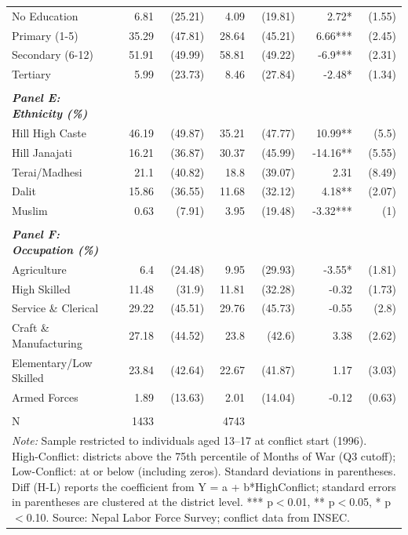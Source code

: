 \begin{landscape}
\begin{table}[!h]
{\begin{tabular}[t]{lrrrrrr}
No Education & 6.81 & (25.21) & 4.09 & (19.81) & 2.72* & (1.55)\\
Primary (1-5) & 35.29 & (47.81) & 28.64 & (45.21) & 6.66*** & (2.45)\\
\addlinespace
Secondary (6-12) & 51.91 & (49.99) & 58.81 & (49.22) & -6.9*** & (2.31)\\
Tertiary & 5.99 & (23.73) & 8.46 & (27.84) & -2.48* & (1.34)\\
 &  &  &  &  &  & \\
\em{\textbf{Panel E: Ethnicity (\%)}} & \em{\textbf{}} & \em{\textbf{}} & \em{\textbf{}} & \em{\textbf{}} & \em{\textbf{}} & \em{\textbf{}}\\
Hill High Caste & 46.19 & (49.87) & 35.21 & (47.77) & 10.99** & (5.5)\\
\addlinespace
Hill Janajati & 16.21 & (36.87) & 30.37 & (45.99) & -14.16** & (5.55)\\
Terai/Madhesi & 21.1 & (40.82) & 18.8 & (39.07) & 2.31 & (8.49)\\
Dalit & 15.86 & (36.55) & 11.68 & (32.12) & 4.18** & (2.07)\\
Muslim & 0.63 & (7.91) & 3.95 & (19.48) & -3.32*** & (1)\\
 &  &  &  &  &  & \\
\addlinespace
\em{\textbf{Panel F: Occupation (\%)}} & \em{\textbf{}} & \em{\textbf{}} & \em{\textbf{}} & \em{\textbf{}} & \em{\textbf{}} & \em{\textbf{}}\\
Agriculture & 6.4 & (24.48) & 9.95 & (29.93) & -3.55* & (1.81)\\
High Skilled & 11.48 & (31.9) & 11.81 & (32.28) & -0.32 & (1.73)\\
Service \& Clerical & 29.22 & (45.51) & 29.76 & (45.73) & -0.55 & (2.8)\\
Craft \& Manufacturing & 27.18 & (44.52) & 23.8 & (42.6) & 3.38 & (2.62)\\
\addlinespace
Elementary/Low Skilled & 23.84 & (42.64) & 22.67 & (41.87) & 1.17 & (3.03)\\
Armed Forces & 1.89 & (13.63) & 2.01 & (14.04) & -0.12 & (0.63)\\
 &  &  &  &  &  & \\
N & 1433 &  & 4743 &  &  & \\
\bottomrule
\multicolumn{7}{l}{\rule{0pt}{1em}\textit{Note: } Sample restricted to individuals aged 13--17 at conflict start (1996). High-Conflict: districts above the 75th percentile of Months of War (Q3 cutoff); Low-Conflict: at or below (including zeros). Standard deviations in parentheses. Diff (H-L) reports the coefficient from Y = a + b*HighConflict; standard errors in parentheses are clustered at the district level. *** p$<$0.01, ** p$<$0.05, * p$<$0.10. Source: Nepal Labor Force Survey; conflict data from INSEC.}\\
\end{tabular}}
\end{table}
\end{landscape}
